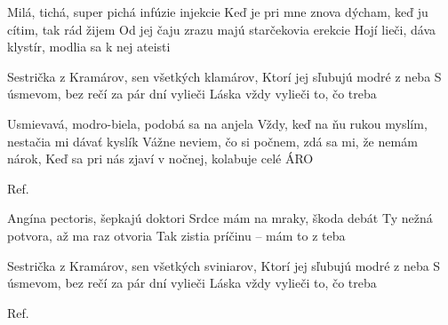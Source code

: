 \resetVars
{}
\MakeHeader
\Lyrics

Milá, tichá, super pichá infúzie injekcie
Keď je pri mne znova dýcham, keď ju cítim, tak rád žijem
Od jej čaju zrazu majú starčekovia erekcie
Hojí lieči, dáva klystír, modlia sa k nej ateisti

Sestrička z Kramárov, sen všetkých klamárov,
Ktorí jej sľubujú modré z neba
S úsmevom, bez rečí za pár dní vylieči
Láska vždy vylieči to, čo treba

Usmievavá, modro-biela, podobá sa na anjela
Vždy, keď na ňu rukou myslím, nestačia mi dávať kyslík
Vážne neviem, čo si počnem, zdá sa mi, že nemám nárok,
Keď sa pri nás zjaví v nočnej, kolabuje celé ÁRO

Ref.

Angína pectoris, šepkajú doktori
Srdce mám na mraky, škoda debát
Ty nežná potvora, až ma raz otvoria
Tak zistia príčinu – mám to z teba

Sestrička z Kramárov, sen všetkých sviniarov,
Ktorí jej sľubujú modré z neba
S úsmevom, bez rečí za pár dní vylieči
Láska vždy vylieči to, čo treba

Ref.

\Next
